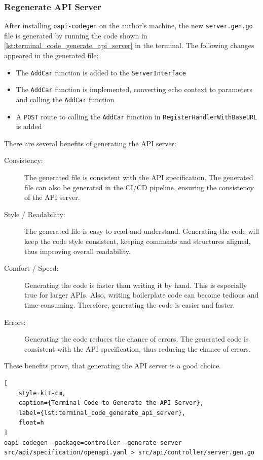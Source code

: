 \subsubsection*{Regenerate API Server}
After installing \texttt{oapi-codegen} on the author's machine, the new \texttt{server.gen.go} file is generated by running the code shown in \autoref{lst:terminal_code_generate_api_server} in the terminal.
The following changes appeared in the generated file:
\begin{itemize}
    \item The \texttt{AddCar} function is added to the \texttt{ServerInterface}
    \item The \texttt{AddCar} function is implemented, converting echo context to parameters and calling the \texttt{AddCar} function
    \item A \texttt{POST} route to calling the \texttt{AddCar} function in \texttt{RegisterHandlerWithBaseURL} is added
\end{itemize}

There are several benefits of generating the API server:
\begin{description}
    \item[Consistency:] The generated file is consistent with the API specification.
        The generated file can also be generated in the CI/CD pipeline, ensuring the consistency of the API server. 
    \item[Style / Readability:] The generated file is easy to read and understand.
        Generating the code will keep the code style consistent, keeping comments and structures aligned, thus improving overall readability.
    \item[Comfort / Speed:] Generating the code is faster than writing it by hand.
        This is especially true for larger APIs.
        Also, writing boilerplate code can become tedious and time-consuming.
        Therefore, generating the code is easier and faster.
    \item[Errors:] Generating the code reduces the chance of errors.
        The generated code is consistent with the API specification, thus reducing the chance of errors.
\end{description}
These benefits prove, that generating the API server is a good choice.

\begin{lstlisting}[
    style=kit-cm,
    caption={Terminal Code to Generate the API Server},
    label={lst:terminal_code_generate_api_server},
    float=h
]
oapi-codegen -package=controller -generate server  src/api/specification/openapi.yaml > src/api/controller/server.gen.go
\end{lstlisting}

